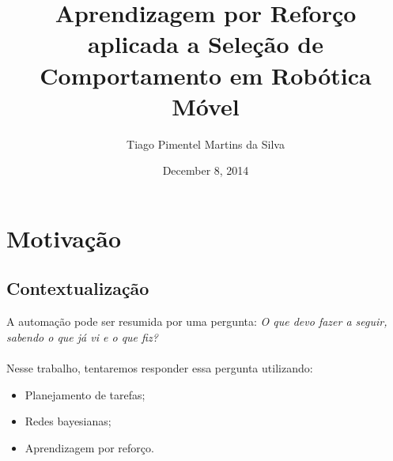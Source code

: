 \documentclass{beamer}
\title[Seleção de Comportamento]{Aprendizagem por Reforço aplicada a Seleção de Comportamento em Robótica Móvel} %
\author{Tiago Pimentel Martins da Silva} %
\institute[UnB] %
{
Universidade de Brasília \\ %
\medskip
\textit{tiagopms@gmail.com} %
}
\date{December 8, 2014} %
\begin{document}
\begin{frame}
\titlepage %
\end{frame}

\begin{frame}
\tableofcontents %
\end{frame}


\section{Motivação} %

\subsection{Contextualização} %

\begin{frame}
A automação pode ser resumida por uma pergunta:
\pause
\textit{O que devo fazer a seguir, sabendo o que já vi e o que fiz?}
\pause
\\~\\

Nesse trabalho, tentaremos responder essa pergunta utilizando:\pause

\begin{itemize}
	\item Planejamento de tarefas;\pause
	\item Redes bayesianas;\pause
	\item Aprendizagem por reforço.
\end{itemize}
\end{frame}
\end{document}
